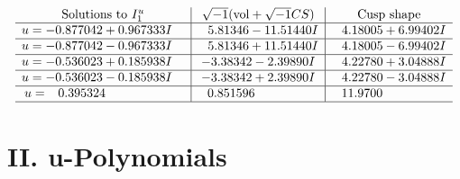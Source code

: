\documentclass[1p]{elsarticle_modified}
\theoremstyle{definition}
\newcommand{\I}{\sqrt{-1}}
\begin{document}
$$\begin{array}{c|c|c}
\text{Solutions to }I^u_{1}& \I (\text{vol} + \sqrt{-1}CS) & \text{Cusp shape}\\
 \hline 
\begin{aligned}
u &= -0.877042 + 0.967333 I\end{aligned}
 & \phantom{-}5.81346 - 11.51440 I & \phantom{-}4.18005 + 6.99402 I \\ \hline\begin{aligned}
u &= -0.877042 - 0.967333 I\end{aligned}
 & \phantom{-}5.81346 + 11.51440 I & \phantom{-}4.18005 - 6.99402 I \\ \hline\begin{aligned}
u &= -0.536023 + 0.185938 I\end{aligned}
 & -3.38342 - 2.39890 I & \phantom{-}4.22780 + 3.04888 I \\ \hline\begin{aligned}
u &= -0.536023 - 0.185938 I\end{aligned}
 & -3.38342 + 2.39890 I & \phantom{-}4.22780 - 3.04888 I \\ \hline\begin{aligned}
u &= \phantom{-}0.395324\phantom{ +0.000000I}\end{aligned}
 & \phantom{-}0.851596\phantom{ +0.000000I} & \phantom{-}11.9700\phantom{ +0.000000I}\\
 \hline 
 \end{array}$$\newpage
\newpage\renewcommand{\arraystretch}{1}
\centering \section*{ II. u-Polynomials}
\end{document}
